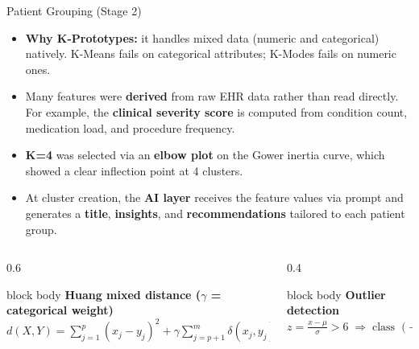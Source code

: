 \documentclass[aspectratio=169,11pt]{beamer}
\newcommand{\kw}[1]{{\color{hospaccent}\bfseries #1}}
\newcommand{\formulabox}[2]{%
  \begin{beamercolorbox}[wd=\linewidth,rounded=true,shadow=false,sep=6pt]{block body}%
    {\color{hospaccent}\footnotesize\bfseries #1}\\[2pt]%
    \centering #2%
  \end{beamercolorbox}}
\begin{document}
\begin{frame}{Patient Grouping (Stage 2)}
  \small
  \begin{itemize}\setlength{\itemsep}{0.5em}
    \item \kw{Why K-Prototypes:} it handles mixed data (numeric and categorical) natively. K-Means fails on categorical attributes; K-Modes fails on numeric ones.
    \item Many features were \kw{derived} from raw EHR data rather than read directly. For example, the \kw{clinical severity score} is computed from condition count, medication load, and procedure frequency.
    \item \kw{K=4} was selected via an \kw{elbow plot} on the Gower inertia curve, which showed a clear inflection point at 4 clusters.
    \item At cluster creation, the \kw{AI layer} receives the feature values via prompt and generates a \kw{title}, \kw{insights}, and \kw{recommendations} tailored to each patient group.
  \end{itemize}
  \begin{columns}[T]
    \begin{column}{0.6\textwidth}
      \formulabox{Huang mixed distance ($\gamma$ = categorical weight)}{%
        $\displaystyle d(X,Y)=\sum_{j=1}^{p}(x_j-y_j)^2+\gamma\!\!\sum_{j=p+1}^{m}\!\!\delta(x_j,y_j)$}
    \end{column}
    \begin{column}{0.4\textwidth}
      \formulabox{Outlier detection}{%
        $\displaystyle z=\frac{x-\mu}{\sigma}>6 \;\Rightarrow\; \text{class }(-1)$}
    \end{column}
  \end{columns}
\end{frame}
\end{document}
